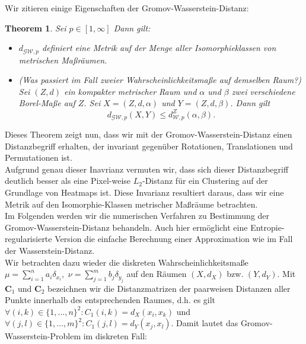 \documentclass[11pt,a4paper]{article}
\newtheorem{theorem}{Theorem}[subsection]
\numberwithin{equation}{section}
\begin{document}
	Wir zitieren einige Eigenschaften der Gromov-Wasserstein-Distanz:
	
	\begin{theorem}\cite[Thm. 5.1]{memoli2011gromov} Sei $p \in [1, \infty]$ Dann gilt:
		\begin{itemize}
			\item[(a)] $d_{\mathcal{GW},p}$ definiert eine Metrik auf der Menge aller Isomorphieklassen von metrischen Maßräumen. 
			\item[(b)] (Was passiert im Fall zweier Wahrscheinlichkeitsmaße auf demselben Raum?) Sei $(Z,d)$ ein kompakter metrischer Raum und $\alpha$ und $\beta$ zwei verschiedene Borel-Maße auf $Z$. Sei $X=(Z,d,\alpha)$ und $Y=(Z,d,\beta)$. Dann gilt
			\begin{equation}
			d_{\mathcal{GW},p}(X,Y) \leq d_{\mathcal{W},p}^Z(\alpha,\beta).
			\end{equation}
		\end{itemize}
		
	\end{theorem}
	
Dieses Theorem zeigt nun, dass wir mit der Gromov-Wasserstein-Distanz einen Distanzbegriff erhalten, der invariant gegenüber Rotationen, Translationen und Permutationen ist\cite{vayer2020contribution}. \\

Aufgrund genau dieser Inavrianz vermuten wir, dass sich dieser Distanzbegriff deutlich besser als eine Pixel-weise $L_2$-Distanz für ein Clustering auf der Grundlage von Heatmaps ist. Diese Invarianz resultiert daraus, dass wir eine Metrik auf den Isomorphie-Klassen metrischer Maßräume betrachten.\\

Im Folgenden werden wir die numerischen Verfahren zu Bestimmung der Gromov-Wasserstein-Distanz behandeln. Auch hier ermöglicht eine Entropie-regularisierte Version die einfache Berechnung einer Approximation wie im Fall der Wasserstein-Distanz.\\
	
Wir betrachten dazu wieder die diskreten Wahrscheinlichkeitsmaße $\mu = \sum_{i=1}^n{a_i\delta_{x_i}},$ $\nu = \sum_{j=1}^m{b_j\delta_{y_j}}$ auf den Räumen $(X,d_X)$ bzw. $(Y,d_Y)$. Mit $\boldsymbol{C}_1$ und $\boldsymbol{C}_2$ bezeichnen wir die Distanzmatrizen der paarweisen Distanzen aller Punkte innerhalb des entsprechenden Raumes, d.h. es gilt $\forall (i,k) \in \lbrace 1,...,n \rbrace^2 : C_1(i,k) = d_X(x_i,x_k)$ und	$\forall (j,l) \in \lbrace 1,...,m \rbrace^2 : C_1(j,l) = d_Y(x_j,x_l)$. Damit lautet das Gromov-Wasserstein-Problem im diskreten Fall:
	
\end{document}

